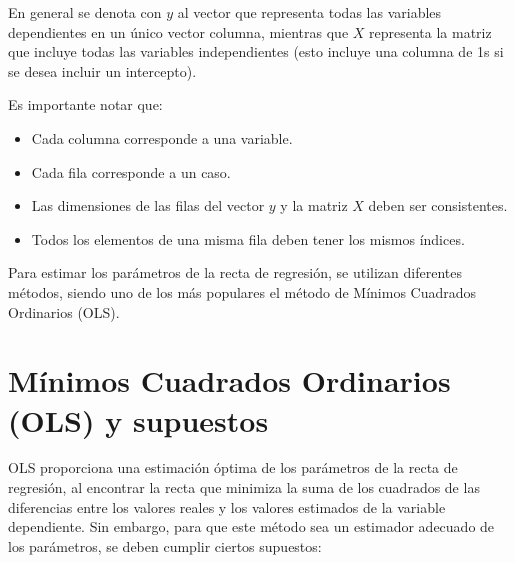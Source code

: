 \documentclass[
]{book}
\providecommand{\tightlist}{%
  \setlength{\itemsep}{0pt}\setlength{\parskip}{0pt}}
\begin{document}
En general se denota con \(y\) al vector que representa todas las
variables dependientes en un único vector columna, mientras que \(X\)
representa la matriz que incluye todas las variables independientes
(esto incluye una columna de 1s si se desea incluir un intercepto).

Es importante notar que:

\begin{itemize}
\tightlist
\item
  Cada columna corresponde a una variable.
\item
  Cada fila corresponde a un caso.
\item
  Las dimensiones de las filas del vector \(y\) y la matriz \(X\) deben
  ser consistentes.
\item
  Todos los elementos de una misma fila deben tener los mismos
  índices.
\end{itemize}

Para estimar los parámetros de la recta de regresión, se utilizan
diferentes métodos, siendo uno de los más populares el método de Mínimos
Cuadrados Ordinarios (OLS).

\hypertarget{muxednimos-cuadrados-ordinarios-ols-y-supuestos-1}{%
\section{Mínimos Cuadrados Ordinarios (OLS) y supuestos}\label{muxednimos-cuadrados-ordinarios-ols-y-supuestos-1}}

OLS proporciona una estimación óptima de los parámetros de la recta de
regresión, al encontrar la recta que minimiza la suma de los cuadrados
de las diferencias entre los valores reales y los valores estimados de
la variable dependiente. Sin embargo, para que este método sea un
estimador adecuado de los parámetros, se deben cumplir ciertos
supuestos:
\end{document}
